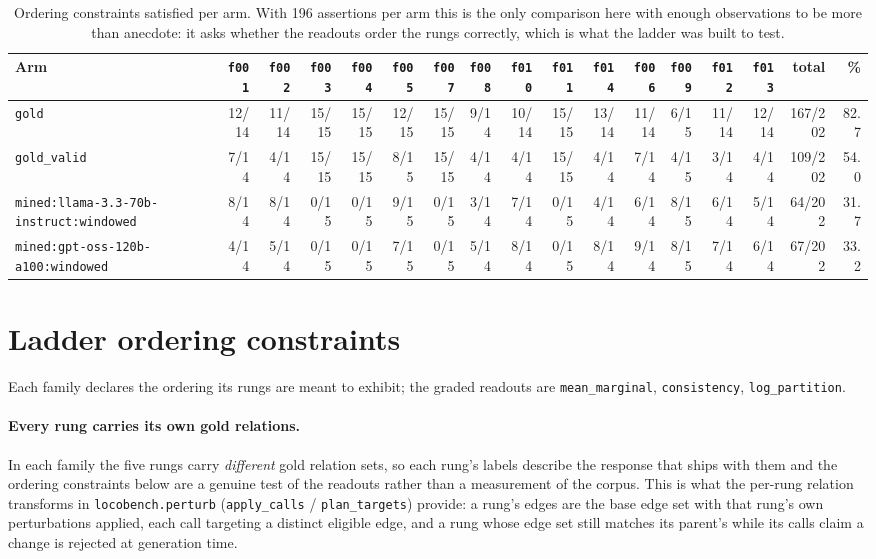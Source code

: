 \documentclass[11pt]{article}
\begin{document}
\begin{table}[htbp]
\centering
\small
\caption{Ordering constraints satisfied per arm. With 196 assertions per arm this is the only comparison here with enough observations to be more than anecdote: it asks whether the readouts order the rungs correctly, which is what the ladder was built to test.}
\label{tab:ladder-by-arm}
\begin{tabular}{lrrrrrrrrrrrrrrrr}
\toprule
Arm & \texttt{f001} & \texttt{f002} & \texttt{f003} & \texttt{f004} & \texttt{f005} & \texttt{f007} & \texttt{f008} & \texttt{f010} & \texttt{f011} & \texttt{f014} & \texttt{f006} & \texttt{f009} & \texttt{f012} & \texttt{f013} & total & \% \\
\midrule
\texttt{gold} & 12/14 & 11/14 & 15/15 & 15/15 & 12/15 & 15/15 & 9/14 & 10/14 & 15/15 & 13/14 & 11/14 & 6/15 & 11/14 & 12/14 & 167/202 & 82.7 \\
\texttt{gold\_valid} & 7/14 & 4/14 & 15/15 & 15/15 & 8/15 & 15/15 & 4/14 & 4/14 & 15/15 & 4/14 & 7/14 & 4/15 & 3/14 & 4/14 & 109/202 & 54.0 \\
\texttt{mined:llama-3.3-70b-instruct:windowed} & 8/14 & 8/14 & 0/15 & 0/15 & 9/15 & 0/15 & 3/14 & 7/14 & 0/15 & 4/14 & 6/14 & 8/15 & 6/14 & 5/14 & 64/202 & 31.7 \\
\texttt{mined:gpt-oss-120b-a100:windowed} & 4/14 & 5/14 & 0/15 & 0/15 & 7/15 & 0/15 & 5/14 & 8/14 & 0/15 & 8/14 & 9/14 & 8/15 & 7/14 & 6/14 & 67/202 & 33.2 \\
\bottomrule
\end{tabular}
\end{table}

\section{Ladder ordering constraints}\label{sec:ladder}

Each family declares the ordering its rungs are meant to exhibit; the graded readouts are \texttt{mean\_marginal}, \texttt{consistency}, \texttt{log\_partition}.

\paragraph{Every rung carries its own gold relations.} In each family the five rungs carry \emph{different} gold relation sets, so each rung's labels describe the response that ships with them and the ordering constraints below are a genuine test of the readouts rather than a measurement of the corpus. This is what the per-rung relation transforms in \texttt{locobench.perturb} (\texttt{apply\_calls} / \texttt{plan\_targets}) provide: a rung's edges are the base edge set with that rung's own perturbations applied, each call targeting a distinct eligible edge, and a rung whose edge set still matches its parent's while its calls claim a change is rejected at generation time.
\end{document}
